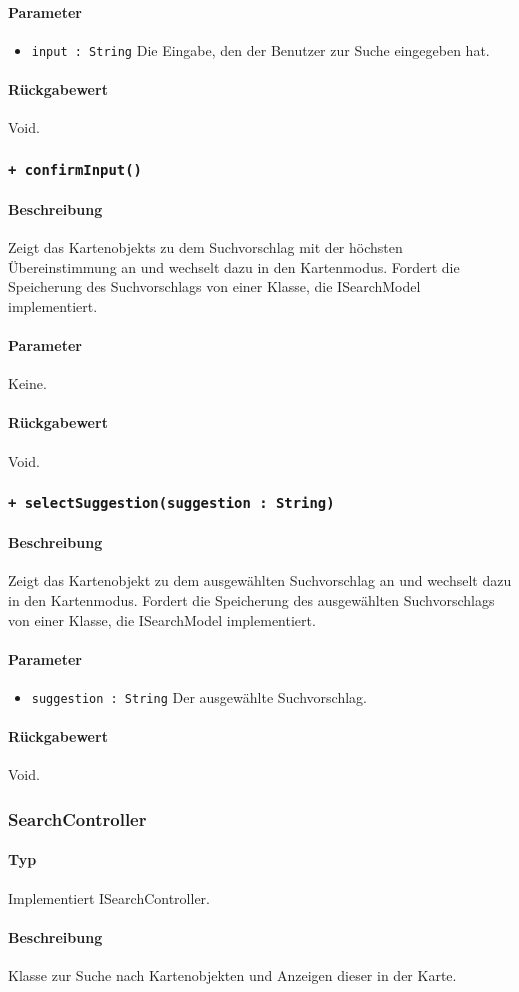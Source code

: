 \paragraph*{Parameter}
\begin{itemize}
    \item \texttt{input : String} Die Eingabe, den der Benutzer zur Suche eingegeben hat.
\end{itemize}
\paragraph*{Rückgabewert}
Void.

\subsubsection*{\texttt{+ confirmInput()}}%
\paragraph*{Beschreibung}
Zeigt das Kartenobjekts zu dem Suchvorschlag mit der höchsten Übereinstimmung an und wechselt dazu in den Kartenmodus.
Fordert die Speicherung des Suchvorschlags von einer Klasse, die ISearchModel implementiert.
\paragraph*{Parameter}
Keine.
\paragraph*{Rückgabewert}
Void.

\subsubsection*{\texttt{+ selectSuggestion(suggestion : String)}}%
\paragraph*{Beschreibung}
Zeigt das Kartenobjekt zu dem ausgewählten Suchvorschlag an und wechselt dazu in den Kartenmodus.
Fordert die Speicherung des ausgewählten Suchvorschlags von einer Klasse, die ISearchModel implementiert.
\paragraph*{Parameter}
\begin{itemize}
    \item \texttt{suggestion : String} Der ausgewählte Suchvorschlag.
\end{itemize}
\paragraph*{Rückgabewert}
Void.


\subsubsection{SearchController}
\paragraph*{Typ}
Implementiert ISearchController.
\paragraph*{Beschreibung}
Klasse zur Suche nach Kartenobjekten und Anzeigen dieser in der Karte.